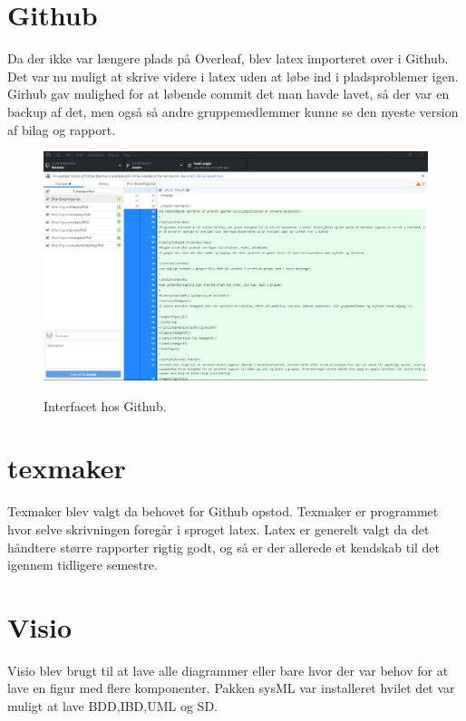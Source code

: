 \section{Github}

Da der ikke var længere plads på Overleaf, blev latex importeret over i Github. Det var nu muligt at skrive videre i latex uden at løbe ind i pladsproblemer igen. Girhub gav mulighed for at løbende commit det man havde lavet, så der var en backup af det, men også så andre gruppemedlemmer kunne se den nyeste version af bilag og rapport. 

\begin{figure}[H]
\centering
{\includegraphics[width=\linewidth]
{Figure/github}}
\caption{Interfacet hos Github.}
\label{github}
\end{figure}


\section{texmaker}
Texmaker blev valgt da behovet for Github opstod. Texmaker er programmet hvor selve skrivningen foregår i sproget latex. Latex er generelt valgt da det håndtere større rapporter rigtig godt, og så er der allerede et kendskab til det igennem tidligere semestre. 

\section{Visio}
Visio blev brugt til at lave alle diagrammer eller bare hvor der var behov for at lave en figur med flere komponenter. Pakken sysML var installeret hvilet det var muligt at lave BDD,IBD,UML og SD.

%



